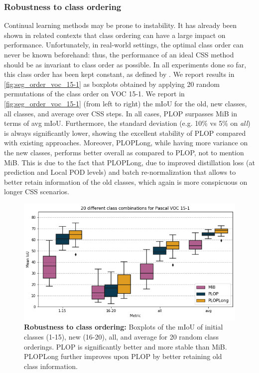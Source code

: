 \subsubsection{Robustness to class ordering}

Continual learning methods may be prone to instability. It has already been shown in related
contexts \citep{kim2019medic} that class ordering can have a large impact on performance.
Unfortunately, in real-world settings, the optimal class order can never be known beforehand: thus,
the performance of an ideal \ac{CSS} method should be as invariant to class order as possible. In all
experiments done so far, this class order has been kept constant, as defined
by \cite{cermelli2020modelingthebackground}. We report results in \autoref{fig:seg_order_voc_15-1}
as boxplots obtained by applying 20 random permutations of the class order on VOC 15-1. We report in
\autoref{fig:seg_order_voc_15-1} (from left to right) the \ac{mIoU} for the old, new classes, all
classes, and average over \ac{CSS} steps. In all cases, PLOP surpasses MiB in terms of avg \ac{mIoU}.
Furthermore, the standard deviation (e.g. 10\% vs 5\% on \textit{all}) is always significantly
lower, showing the excellent stability of PLOP compared with existing approaches. Moreover,
PLOPLong, while having more variance on the new classes, performs better overall as compared to
PLOP, not to mention MiB. This is due to the fact that PLOPLong, due to improved distillation loss
(at prediction and Local POD levels) and batch re-normalization that allows to better retain
information of the old classes, which again is more conspicuous on longer \ac{CSS} scenarios.




\begin{figure}
    \includegraphics[width=\linewidth]{images/seg/order_voc_15-1.png}
    \vspace*{-0.3cm}
    \caption{\textbf{Robustness to class ordering:} Boxplots of the \ac{mIoU} of initial classes (1-15), new (16-20), all, and average for
        20 random class orderings. PLOP is significantly better and more stable than MiB. PLOPLong
        further improves upon PLOP by better retaining old class information.}
    \label{fig:seg_order_voc_15-1}
\end{figure}



